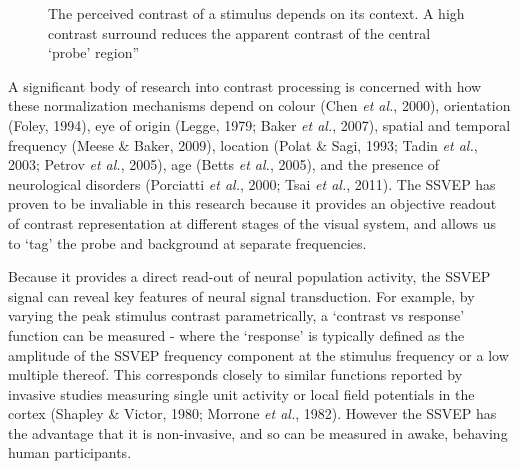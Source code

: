\documentclass[
  letterpaper,
  DIV=11,
  numbers=noendperiod]{scrartcl}
\begin{document}
\begin{figure}


\caption{\label{fig-centresurround}The perceived contrast of a stimulus
depends on its context. A high contrast surround reduces the apparent
contrast of the central `probe' region''}

\end{figure}%

A significant body of research into contrast processing is concerned
with how these normalization mechanisms depend on colour (Chen \emph{et
al.}, 2000), orientation (Foley, 1994), eye of origin (Legge, 1979;
Baker \emph{et al.}, 2007), spatial and temporal frequency (Meese \&
Baker, 2009), location (Polat \& Sagi, 1993; Tadin \emph{et al.}, 2003;
Petrov \emph{et al.}, 2005), age (Betts \emph{et al.}, 2005), and the
presence of neurological disorders (Porciatti \emph{et al.}, 2000; Tsai
\emph{et al.}, 2011). The SSVEP has proven to be invaliable in this
research because it provides an objective readout of contrast
representation at different stages of the visual system, and allows us
to `tag' the probe and background at separate frequencies.

Because it provides a direct read-out of neural population activity, the
SSVEP signal can reveal key features of neural signal transduction. For
example, by varying the peak stimulus contrast parametrically, a
`contrast vs response' function can be measured - where the `response'
is typically defined as the amplitude of the SSVEP frequency component
at the stimulus frequency or a low multiple thereof. This corresponds
closely to similar functions reported by invasive studies measuring
single unit activity or local field potentials in the cortex (Shapley \&
Victor, 1980; Morrone \emph{et al.}, 1982). However the SSVEP has the
advantage that it is non-invasive, and so can be measured in awake,
behaving human participants.
\end{document}
